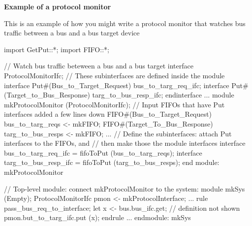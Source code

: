 {\bf Example of a protocol monitor}

This is an example of how you might write a protocol monitor that
watches bus traffic between a bus and a bus target device

\begin{libverbatim}
     import GetPut::*;
     import FIFO::*;

     // Watch bus traffic beteween a bus and a bus target
     interface ProtocolMonitorIfc;
        // These subinterfaces are defined inside the module
        interface Put#(Bus_to_Target_Request)  bus_to_targ_req_ifc;
        interface Put#(Target_to_Bus_Response) targ_to_bus_resp_ifc;
     endinterface
     ...
     module mkProtocolMonitor (ProtocolMonitorIfc);
        // Input FIFOs that have Put interfaces added a few lines down
        FIFO#(Bus_to_Target_Request) bus_to_targ_reqs <- mkFIFO;
        FIFO#(Target_To_Bus_Response) targ_to_bus_resps <- mkFIFO;
     ...
        // Define the subinterfaces: attach Put interfaces to the FIFOs, and
        //   then make those the module interfaces
        interface bus_to_targ_req_ifc = fifoToPut (bus_to_targ_reqs);
        interface targ_to_bus_resp_ifc = fifoToPut (targ_to_bus_resps);
     end module: mkProtocolMonitor

     // Top-level module: connect mkProtocolMonitor to the system:
     module mkSys (Empty);
        ProtocolMonitorIfc pmon <- mkProtocolInterface;
     ...
        rule pass_bus_req_to_interface;
            let x <- bus.bus_ifc.get;     // definition not shown
            pmon.but_to_targ_ifc.put (x);
        endrule
     ...
     endmodule: mkSys
\end{libverbatim}




